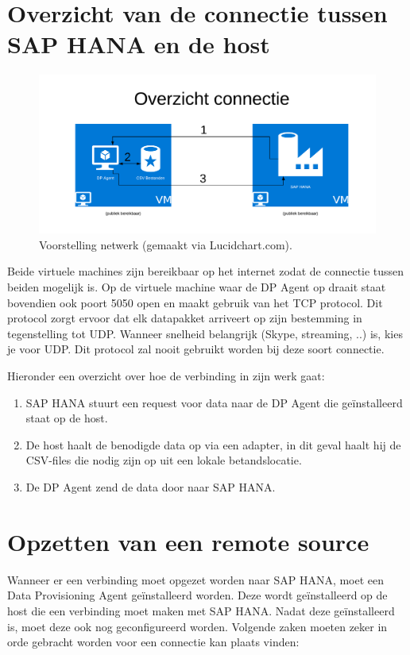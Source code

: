 \section{Overzicht van de connectie tussen SAP HANA en de host}
\begin{figure}[h]
	\centering
	\includegraphics[scale=0.5]{../images/AzureConnectieBP.png}
	\caption{Voorstelling netwerk (gemaakt via Lucidchart.com).}
	\label{fig:azureconn}
\end{figure}

Beide virtuele machines zijn bereikbaar op het internet zodat de connectie tussen beiden mogelijk is. Op de virtuele machine waar de DP Agent op draait staat bovendien ook poort 5050 open en maakt gebruik van het TCP protocol. Dit protocol zorgt ervoor dat elk datapakket arriveert op zijn bestemming in tegenstelling tot UDP. Wanneer snelheid belangrijk (Skype, streaming, ..) is, kies je voor UDP. Dit protocol zal nooit gebruikt worden bij deze soort connectie.

Hieronder een overzicht over hoe de verbinding in zijn werk gaat:

\begin{enumerate}
	\item SAP HANA stuurt een request voor data naar de DP Agent die geïnstalleerd staat op de host.
	\item De host haalt de benodigde data op via een adapter, in dit geval haalt hij de CSV-files die nodig zijn op uit een lokale betandslocatie.
	\item De DP Agent zend de data door naar SAP HANA.
\end{enumerate}

\section{Opzetten van een remote source}
Wanneer er een verbinding moet opgezet worden naar SAP HANA, moet een Data Provisioning Agent geïnstalleerd worden. Deze wordt geïnstalleerd op de host die een verbinding moet maken met SAP HANA. Nadat deze geïnstalleerd is, moet deze ook nog geconfigureerd worden. Volgende zaken moeten zeker in orde gebracht worden voor een connectie kan plaats vinden: 

